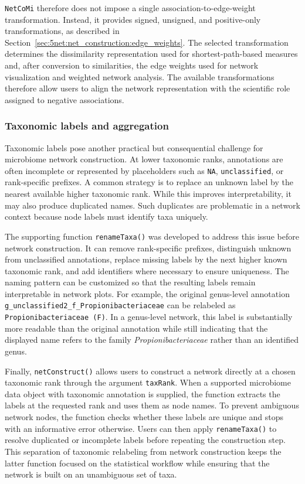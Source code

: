 \texttt{NetCoMi} therefore does not impose a single association-to-edge-weight transformation. Instead, it provides signed, unsigned, and positive-only transformations, as described in Section~\ref{sec:5net:net_construction:edge_weights}. The selected transformation determines the dissimilarity representation used for shortest-path-based measures and, after conversion to similarities, the edge weights used for network visualization and weighted network analysis. The available transformations therefore allow users to align the network representation with the scientific role assigned to negative associations.

\subsubsection*{Taxonomic labels and aggregation}

Taxonomic labels pose another practical but consequential challenge for microbiome network construction. At lower taxonomic ranks, annotations are often incomplete or represented by placeholders such as \texttt{NA}, \texttt{unclassified}, or rank-specific prefixes. A common strategy is to replace an unknown label by the nearest available higher taxonomic rank. While this improves interpretability, it may also produce duplicated names. Such duplicates are problematic in a network context because node labels must identify taxa uniquely.

The supporting function \texttt{renameTaxa()} was developed to address this issue before network construction. It can remove rank-specific prefixes, distinguish unknown from unclassified annotations, replace missing labels by the next higher known taxonomic rank, and add identifiers where necessary to ensure uniqueness. The naming pattern can be customized so that the resulting labels remain interpretable in network plots. For example, the original genus-level annotation \texttt{g\_unclassified2\_f\_Propionibacteriaceae} can be relabeled as \texttt{Propionibacteriaceae (F)}. In a genus-level network, this label is substantially more readable than the original annotation while still indicating that the displayed name refers to the family \emph{Propionibacteriaceae} rather than an identified genus.

Finally, \texttt{netConstruct()} allows users to construct a network directly at a chosen taxonomic rank through the argument \texttt{taxRank}. When a supported microbiome data object with taxonomic annotation is supplied, the function extracts the labels at the requested rank and uses them as node names. To prevent ambiguous network nodes, the function checks whether these labels are unique and stops with an informative error otherwise. Users can then apply \texttt{renameTaxa()} to resolve duplicated or incomplete labels before repeating the construction step. This separation of taxonomic relabeling from network construction keeps the latter function focused on the statistical workflow while ensuring that the network is built on an unambiguous set of taxa.

